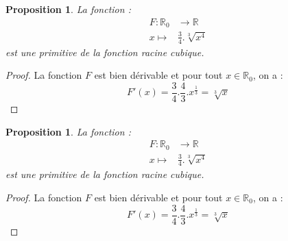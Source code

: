 \documentclass[a4paper,fontsize=13pt]{scrreprt}
\theoremstyle{plain}
\newtheorem{pro}[subsection]{Proposition}
\theoremstyle{definition}
\newcommand{\rr}{\mathbb{R}}
\begin{document}
\begin{pro}
La fonction :
\begin{align*}
F : {\rr}_{0} &\to \rr \\
x \mapsto& \frac{3}{4}.\sqrt[3]{x^4}
\end{align*}
est une primitive de la fonction racine cubique.
\end{pro}
\begin{proof}
La fonction $F$ est bien dérivable et pour tout $x\in {\rr}_{0}$, on a :
$$F'(x) = \frac{3}{4}.\frac{4}{3}.x^{\frac{1}{3}} = \sqrt[3]{x}$$ 
\end{proof}

\begin{pro}
La fonction :
\begin{align*}
F : {\rr}_{0} &\to \rr \\
x \mapsto& \frac{3}{4}.\sqrt[3]{x^4}
\end{align*}
est une primitive de la fonction racine cubique.
\end{pro}
\begin{proof}
La fonction $F$ est bien dérivable et pour tout $x\in {\rr}_{0}$, on a :
$$F'(x) = \frac{3}{4}.\frac{4}{3}.x^{\frac{1}{3}} = \sqrt[3]{x}$$ 
\end{proof}
\end{document}
